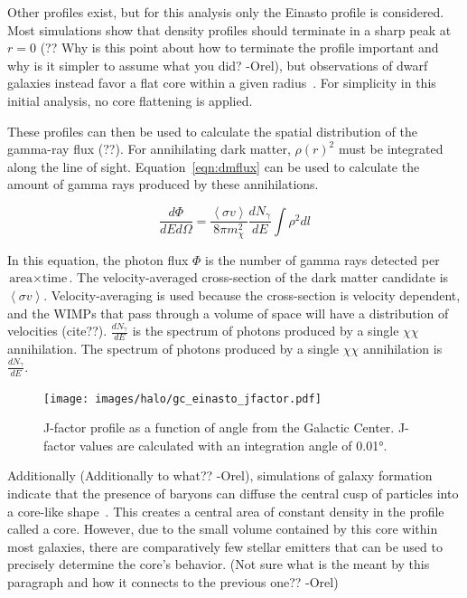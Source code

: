     Other profiles exist, but for this analysis only the Einasto profile is considered.
    Most simulations show that density profiles should terminate in a sharp peak at $r=0$ {\color{red}(?? Why is this point about how to terminate the profile important and why is it simpler to assume what you did? -Orel)}, but observations of dwarf galaxies instead favor a flat core within a given radius~\cite{CoreVsCusp}.
    For simplicity in this initial analysis, no core flattening is applied.
    
    These profiles can then be used to calculate the spatial distribution of the gamma-ray {\color{red}flux (??)}.
    For annihilating dark matter, $\rho\left(r\right)^2$ must be integrated along the line of sight.
    Equation~\ref{eqn:dmflux} can be used to calculate the amount of gamma rays produced by these annihilations.
    
    \begin{equation}\label{eqn:dmflux}
      \frac{ d\Phi }{ dE d \Omega } = \frac{ \left \langle \sigma v \right \rangle }{8 \pi m_\chi^2} \frac{dN_{\gamma}}{dE} \int \rho^2 dl
    \end{equation}
    
    In this equation, the photon flux $\Phi$ is the number of gamma rays detected per $\textrm{area}\times\textrm{time}$.
    The velocity-averaged cross-section of the dark matter candidate is $\left \langle \sigma v \right \rangle$.
    Velocity-averaging is used because the cross-section is velocity dependent, and the WIMPs that pass through a volume of space will have a distribution of velocities {\color{red}(cite??)}.
    $\frac{dN_{\gamma}}{dE}$ is the spectrum of photons produced by a single $\chi\chi$ annihilation.
    The spectrum of photons produced by a single $\chi\chi$ annihilation is $\frac{dN_{\gamma}}{dE}$.
    
    \begin{figure}[ht]
    \centering
      \texttt{[image: images/halo/gc\_einasto\_jfactor.pdf]}
      \caption[Galactic Center Einasto Halo Jfactor]{
        J-factor profile as a function of angle from the Galactic Center.
        J-factor values are calculated with an integration angle of \ang{0.01}.
      }
      \label{fig:gchalo_jfactor}
    \end{figure}
    
    {\color{red}Additionally (Additionally to what?? -Orel)}, simulations of galaxy formation indicate that the presence of baryons can diffuse the central cusp of particles into a core-like shape~\cite{corecusp_baryondiffuse1,corecusp_baryondiffuse2}.
    This creates a central area of constant density in the profile called a core.
    However, due to the small volume contained by this core within most galaxies, there are comparatively few stellar emitters that can be used to precisely determine the core's behavior.
    {\color{red}(Not sure what is the meant by this paragraph and how it connects to the previous one?? -Orel)}

